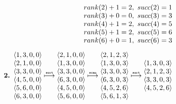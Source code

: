 \begin{align*}
\begin{matrix}
    rank(2) + 1 = 2,\ succ(2) = 1 \\
    rank(3) + 0 = 0,\ succ(3) = 3 \\
    rank(4) + 1 = 2,\ succ(4) = 5 \\
    rank(5) + 1 = 2,\ succ(5) = 6 \\
    rank(6) + 0 = 1,\ succ(6) = 3 \\
  \end{matrix} \\[0.5em]
  \text{\bf 2. }
  \begin{matrix}
    \langle 1, 3, 0, 0 \rangle \\
    \langle 2, 1, 0, 0 \rangle \\
    \langle 3, 3, 0, 0 \rangle \\
    \langle 4, 5, 0, 0 \rangle \\
    \langle 5, 6, 0, 0 \rangle \\
    \langle 6, 3, 0, 0 \rangle \\
  \end{matrix}
  \stackrel{\text{\tiny \tt sort}}{\longmapsto}
  \begin{matrix}
    \langle 2, 1, 0, 0 \rangle \\
    \langle 1, 3, 0, 0 \rangle \\
    \langle 3, 3, 0, 0 \rangle \\
    \langle 6, 3, 0, 0 \rangle \\
    \langle 4, 5, 0, 0 \rangle \\
    \langle 5, 6, 0, 0 \rangle \\
  \end{matrix}
  \stackrel{\text{\tiny \tt scan}}{\longmapsto}
  \begin{matrix}
    \langle 2, 1, 2, 3 \rangle \\
    \langle 1, 3, 0, 3 \rangle \\
    \langle 3, 3, 0, 3 \rangle \\
    \langle 6, 3, 0, 3 \rangle \\
    \langle 4, 5, 2, 6 \rangle \\
    \langle 5, 6, 1, 3 \rangle \\
  \end{matrix}
  \stackrel{\text{\tiny \tt sort}}{\longmapsto}
  \begin{matrix}
    \langle 1, 3, 0, 3 \rangle \\
    \langle 2, 1, 2, 3 \rangle \\
    \langle 3, 3, 0, 3 \rangle \\
    \langle 4, 5, 2, 6 \rangle \\

\end{matrix}
\end{align*}
